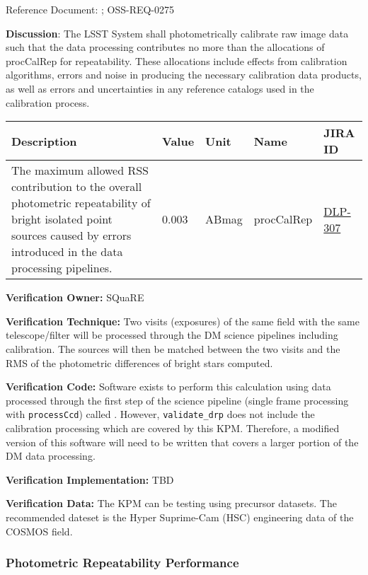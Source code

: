 \documentclass[DM,lsstdraft,toc]{lsstdoc}
\newcommand{\jira}[1]{\href{https://jira.lsstcorp.org/browse/#1}{#1}}
\begin{document}
Reference Document: ; OSS-REQ-0275

\textbf{Discussion}: The LSST System shall photometrically calibrate raw
image data such that the data processing contributes no more than the
allocations of procCalRep for repeatability. These allocations include
effects from calibration algorithms, errors and noise in producing the
necessary calibration data products, as well as errors and uncertainties
in any reference catalogs used in the calibration process.

\begin{longtable}[]{@{}p{}llll@{}}
\toprule
Description & Value & Unit & Name & JIRA ID\tabularnewline
\midrule
\endhead
The maximum allowed RSS contribution to the overall photometric
repeatability of bright isolated point sources caused by errors
introduced in the data processing pipelines. & 0.003 & ABmag &
procCalRep & \jira{DLP-307}\tabularnewline
\bottomrule
\end{longtable}

\textbf{Verification Owner:} SQuaRE

\textbf{Verification Technique:} Two visits (exposures) of the same
field with the same telescope/filter will be processed through the DM
science pipelines including calibration. The sources will then be
matched between the two visits and the RMS of the photometric
differences of bright stars computed.

\textbf{Verification Code:} Software exists to perform this calculation
using data processed through the first step of the science pipeline
(single frame processing with \texttt{processCcd}) called . However, \texttt{validate\_drp}
does not include the calibration processing which are covered by this
KPM. Therefore, a modified version of this software will need to be
written that covers a larger portion of the DM data processing.

\textbf{Verification Implementation:} TBD

\textbf{Verification Data:} The KPM can be testing using precursor
datasets. The recommended dateset is the Hyper Suprime-Cam (HSC)
engineering data of the COSMOS field.

\subsubsection{Photometric Repeatability
Performance}\label{photometric-repeatability-performance}
\end{document}
